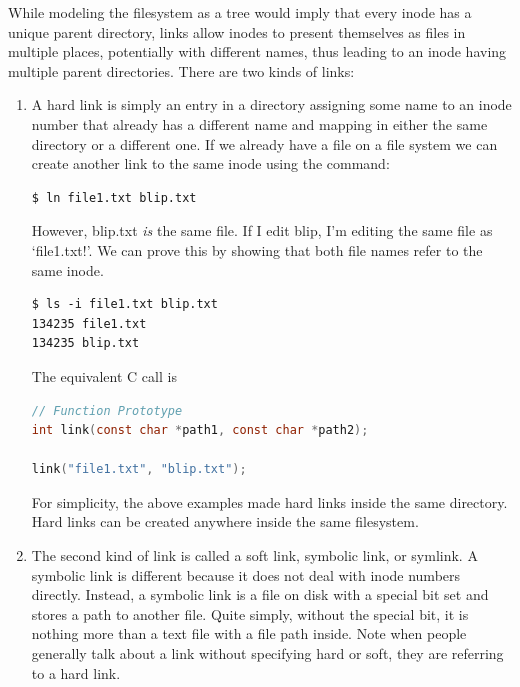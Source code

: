 While modeling the filesystem as a tree would imply that every inode has a unique parent directory, links allow inodes to present themselves as files in multiple places, potentially with different names, thus leading to an inode having multiple parent directories.
There are two kinds of links:

\begin{enumerate}
    \item {}
        A hard link is simply an entry in a directory assigning some name to an inode number that already has a different name and mapping in either the same directory or a different one.
        If we already have a file on a file system we can create another link to the same inode using the  command:

\begin{lstlisting}[language=bash]
$ ln file1.txt blip.txt
\end{lstlisting}

        However, blip.txt \emph{is} the same file.
        If I edit blip, I'm editing the same file as `file1.txt!'.
        We can prove this by showing that both file names refer to the same inode.

\begin{verbatim}
$ ls -i file1.txt blip.txt
134235 file1.txt
134235 blip.txt
\end{verbatim}

        The equivalent C call is 

\begin{lstlisting}[language=C]
// Function Prototype
int link(const char *path1, const char *path2);

link("file1.txt", "blip.txt");
\end{lstlisting}

        For simplicity, the above examples made hard links inside the same directory.
        Hard links can be created anywhere inside the same filesystem.

    \item {}
        The second kind of link is called a soft link, symbolic link, or symlink.
        A symbolic link is different because it does not deal with inode numbers directly.
        Instead, a symbolic link is a file on disk with a special bit set and stores a path to another file.
        Quite simply, without the special bit, it is nothing more than a text file with a file path inside.
        Note when people generally talk about a link without specifying hard or soft, they are referring to a hard link.


\end{enumerate}
